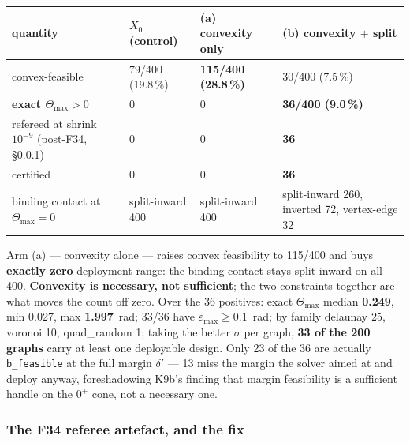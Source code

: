 \documentclass[10pt,a4paper]{article}
\newcommand{\fn}[1]{\nolinkurl{#1}}
\begin{document}
\begin{table}[h]\centering\small
\begin{tabular}{@{}p{48mm}p{28mm}p{28mm}p{40mm}@{}}
\toprule
quantity & $X_0$ (control) & (a) convexity only & (b) convexity $+$ split \\
\midrule
convex-feasible & 79/400 (19.8\,\%) & \textbf{115/400 (28.8\,\%)} & 30/400 (7.5\,\%) \\
\textbf{exact $\Theta_{\max}>0$} & 0 & 0 & \textbf{36/400 (9.0\,\%)} \\
refereed at shrink $10^{-9}$ (post-F34, \S\ref{sec:day3-f34}) & 0 & 0 & \textbf{36} \\
certified & 0 & 0 & \textbf{36} \\
binding contact at $\Theta_{\max}=0$ & split-inward 400 & split-inward 400 & split-inward 260,
inverted 72, vertex-edge 32 \\
\bottomrule
\end{tabular}
\end{table}

Arm (a) --- convexity alone --- raises convex feasibility to 115/400 and buys \textbf{exactly
zero} deployment range: the binding contact stays split-inward on all 400. \textbf{Convexity is
necessary, not sufficient}; the two constraints together are what moves the count off zero. Over
the 36 positives: exact $\Theta_{\max}$ median \textbf{0.249}, min 0.027, max
\textbf{1.997}~rad; 33/36 have $\varepsilon_{\max}\ge0.1$~rad; by family delaunay 25, voronoi 10,
quad\_random 1; taking the better $\sigma$ per graph, \textbf{33 of the 200 graphs} carry at
least one deployable design. Only 23 of the 36 are actually \fn{b\_feasible} at the full margin
$\delta'$ --- 13 miss the margin the solver aimed at and deploy anyway, foreshadowing K9b's
finding that margin feasibility is a sufficient handle on the $0^+$ cone, not a necessary one.

\subsubsection{The F34 referee artefact, and the fix}
\label{sec:day3-f34}
\end{document}
